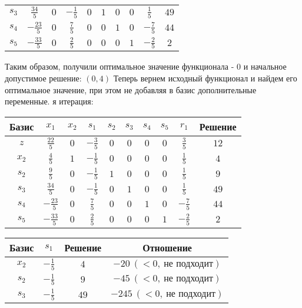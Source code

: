 \documentclass{article}%
\begin{document}
\begin{flushleft}
\begin{tabular}{|c|cccccccc|c|}
$s_{3}$&$\frac{34}{5}$&$0$&$-\frac{1}{5}$&$0$&$1$&$0$&$0$&$\frac{1}{5}$&$49$\\%
$s_{4}$&$-\frac{23}{5}$&$0$&$\frac{7}{5}$&$0$&$0$&$1$&$0$&$-\frac{7}{5}$&$44$\\%
$s_{5}$&$-\frac{33}{5}$&$0$&$\frac{2}{5}$&$0$&$0$&$0$&$1$&$-\frac{2}{5}$&$2$\\%
\hline%
\end{tabular}%
\newline%
\newline%
Таким образом, получили оптимальное значение функционала {-} 0 и начальное допустимое решение: %
$(0, 4)$%
\newline%
Теперь вернем исходный функционал и найдем его оптимальное значение, при этом не добавляя в базис дополнительные переменные.%
я итерация: %
\newline%
\newline%
\renewcommand{\arraystretch}{1.3}%
\begin{tabular}{|c|cccccccc|c|}%
\hline%
Базис&$x_{1}$&$x_{2}$&$s_{1}$&$s_{2}$&$s_{3}$&$s_{4}$&$s_{5}$&$r_{1}$&Решение\\%
\hline%
$z$&$\frac{22}{5}$&$0$&$-\frac{3}{5}$&$0$&$0$&$0$&$0$&$\frac{3}{5}$&$12$\\%
\hline%
$x_{2}$&$\frac{4}{5}$&$1$&$-\frac{1}{5}$&$0$&$0$&$0$&$0$&$\frac{1}{5}$&$4$\\%
$s_{2}$&$\frac{9}{5}$&$0$&$-\frac{1}{5}$&$1$&$0$&$0$&$0$&$\frac{1}{5}$&$9$\\%
$s_{3}$&$\frac{34}{5}$&$0$&$-\frac{1}{5}$&$0$&$1$&$0$&$0$&$\frac{1}{5}$&$49$\\%
$s_{4}$&$-\frac{23}{5}$&$0$&$\frac{7}{5}$&$0$&$0$&$1$&$0$&$-\frac{7}{5}$&$44$\\%
$s_{5}$&$-\frac{33}{5}$&$0$&$\frac{2}{5}$&$0$&$0$&$0$&$1$&$-\frac{2}{5}$&$2$\\%
\hline%
\end{tabular}%
\newline%
\newline%
\newline%
\begin{tabular}{|cccc|}%
\hline%
Базис&$s_{1}$&Решение&Отношение\\%
\hline%
$x_{2}$&$-\frac{1}{5}$&$4$&$-20\: (< 0, \: \text{не подходит})$\\%
$s_{2}$&$-\frac{1}{5}$&$9$&$-45\: (< 0, \: \text{не подходит})$\\%
$s_{3}$&$-\frac{1}{5}$&$49$&$-245\: (< 0, \: \text{не подходит})$\\%

\end{tabular}
\end{flushleft}
\end{document}
